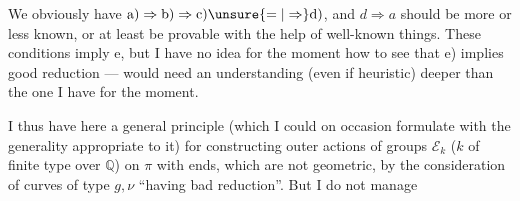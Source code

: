 We obviously have $\mathrm{a)}\Rightarrow\mathrm{b)}\Rightarrow\mathrm{c)}\unsure{=|\Rightarrow}\mathrm{d)}$,
and $d\Rightarrow a$ should be more or less
known, or at least be provable
with the help of well-known things. These
conditions imply e, but I have
no idea for the moment how
to see that e) implies good reduction ---
would need an understanding (even if
heuristic) deeper than the one
I have for the moment.

I thus have here a general principle
(which I could on occasion formulate
with the generality appropriate to it) for
constructing  outer actions
of groups $\mathcal E_k$ ($k$  of finite type
over $\mathbb{Q}$) on $\pi$ with ends, which
are not geometric, by  the
consideration of curves of type $g,\nu$
``having bad reduction''. But I do not manage
